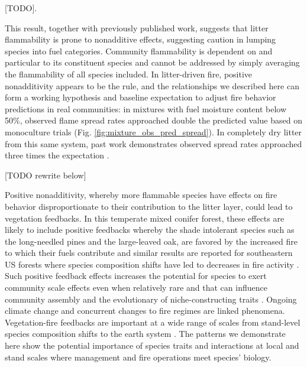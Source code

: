 \documentclass[letterpaper,12pt]{article}
\begin{document}

[TODO]. 

This result, together with previously published
work, suggests that litter flammability is prone to nonadditive effects,
suggesting caution in lumping species into fuel categories. Community
flammability is dependent on and particular to its constituent species and
cannot be addressed by simply averaging the flammability of all species
included. In litter-driven fire, positive nonadditivity appears to be the rule,
and the relationships we described here can form a working hypothesis and
baseline expectation to adjust fire behavior predictions in real communities:
in mixtures with fuel moisture content below 50\%, observed flame spread rates
approached double the predicted value based on monoculture trials (Fig.
\ref{fig:mixture_obs_pred_spread}). In completely dry litter from this same
system, past work demonstrates observed spread rates approached three times the
expectation \citep{Magalhaes+Schwilk-2012}.

[TODO rewrite below]

Positive nonadditivity, whereby more flammable species have effects on fire
behavior disproportionate to their contribution to the litter layer, could lead
to vegetation feedbacks. In this temperate mixed conifer forest, these effects
are likely to include positive feedbacks whereby the shade intolerant species
such as the long-needled pines and the large-leaved oak, are favored by the
increased fire to which their fuels contribute \citep{Schwilk+Caprio-2011} and
similar results are reported for southeastern US forests where species
composition shifts have led to decreases in fire activity
\citep{Nowacki+Abrams-2008}. Such positive feedback effects increases the
potential for species to exert community scale effects even when relatively
rare and that can influence community assembly and the evolutionary of
niche-constructing traits \citep{Kerr+Schwilk+etal-1999, Schwilk+Kerr-2002}.
Ongoing climate change and concurrent changes to fire regimes are linked
phenomena. Vegetation-fire feedbacks are important at a wide range of scales
from stand-level species composition shifts to the earth system
\citep{Harris+Remenyi+etal-2016, Archibald+Lehmann+etal-2018}. The patterns we
demonstrate here show the potential importance of species traits and
interactions at local and stand scales where management and fire operations
meet species' biology.
\end{document}
